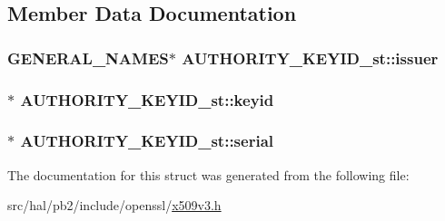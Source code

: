 \subsection{Member Data Documentation}
\subsubsection[{\texorpdfstring{issuer}{issuer}}]{\setlength{\rightskip}{0pt plus 5cm}G\+E\+N\+E\+R\+A\+L\+\_\+\+N\+A\+M\+ES$\ast$ A\+U\+T\+H\+O\+R\+I\+T\+Y\+\_\+\+K\+E\+Y\+I\+D\+\_\+st\+::issuer}\hypertarget{struct_a_u_t_h_o_r_i_t_y___k_e_y_i_d__st_a3a750d3a2a795e1a0dfb98f0e16bf339}{}\label{struct_a_u_t_h_o_r_i_t_y___k_e_y_i_d__st_a3a750d3a2a795e1a0dfb98f0e16bf339}
\subsubsection[{\texorpdfstring{keyid}{keyid}}]{$\ast$ A\+U\+T\+H\+O\+R\+I\+T\+Y\+\_\+\+K\+E\+Y\+I\+D\+\_\+st\+::keyid}\hypertarget{struct_a_u_t_h_o_r_i_t_y___k_e_y_i_d__st_ad9aea22a1fc62bcf0669f7feba4e38a7}{}\label{struct_a_u_t_h_o_r_i_t_y___k_e_y_i_d__st_ad9aea22a1fc62bcf0669f7feba4e38a7}
\subsubsection[{\texorpdfstring{serial}{serial}}]{$\ast$ A\+U\+T\+H\+O\+R\+I\+T\+Y\+\_\+\+K\+E\+Y\+I\+D\+\_\+st\+::serial}\hypertarget{struct_a_u_t_h_o_r_i_t_y___k_e_y_i_d__st_a266ae5a8b48cee3727995cf791bc7d8c}{}\label{struct_a_u_t_h_o_r_i_t_y___k_e_y_i_d__st_a266ae5a8b48cee3727995cf791bc7d8c}


The documentation for this struct was generated from the following file\+:\begin{DoxyCompactItemize}
\item 
src/hal/pb2/include/openssl/\hyperlink{x509v3_8h}{x509v3.\+h}\end{DoxyCompactItemize}
